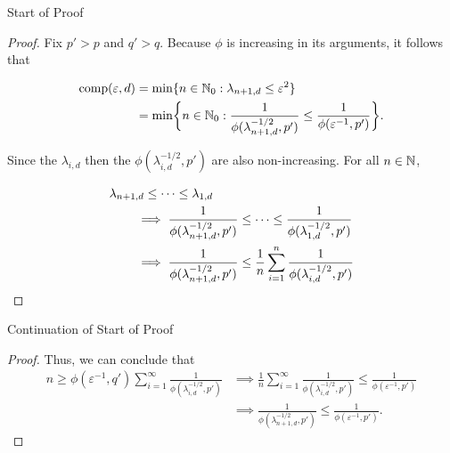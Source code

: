 \documentclass[11pt,compress,xcolor={usenames,dvipsnames},aspectratio=169]{beamer}
\begin{document}
\begin{frame}{Start of Proof}
\begin{proof}
\vspace{-3ex}
Fix $p' > p$ and $q' > q$.  Because $\phi$ is increasing in its arguments, it follows that

\vspace{-6ex}
\begin{align*}
    \operatorname{comp}(\varepsilon, d) &= \min \{n \in \mathbb{N}_{0} : \lambda_{n+1, d} \le \varepsilon^2\} \\
    &= \min \biggl\{n \in \mathbb{N}_{0} : \frac{1}{\phi(\lambda_{n+1, d}^{-1/2},p')} \le \frac{1}{\phi(\varepsilon^{-1},p')} \biggr\}.
\end{align*}

\vspace{-4ex}
Since the $\lambda_{i,d}$ then the $\phi(\lambda_{i, d}^{-1/2},p')$ are also non-increasing.  For all $n \in \mathbb{N}$,

\vspace{-6ex}
\begin{align*}
    \MoveEqLeft{\lambda_{n+1,d} \le \cdots \le \lambda_{1,d}} \\
    & \implies \frac{1}{\phi(\lambda_{n+1, d}^{-1/2},p')}  \le \cdots \le \frac{1}{\phi(\lambda_{1, d}^{-1/2},p')} \\
    & \implies \frac{1}{\phi(\lambda_{n+1, d}^{-1/2},p')} 
    \le \frac 1n \sum_{i=1}^n  \frac{1}{\phi(\lambda_{i, d}^{-1/2},p')}
\end{align*}
\end{proof}
\end{frame}

\begin{frame}{Continuation of Start of Proof}
\begin{proof}
\vspace{-3ex}
Thus, we can conclude that 
\begin{align*}
    n \ge \phi(\varepsilon^{-1},q') \sum_{i=1}^\infty \frac{1}{\phi(\lambda_{i, d}^{-1/2},p')}
    & \implies 
  \frac 1n \sum_{i=1}^\infty \frac{1}{\phi(\lambda_{i, d}^{-1/2},p')} \le  \frac{1}{\phi(\varepsilon^{-1},p')} \\
   & \implies   \frac{1}{\phi(\lambda_{n+1, d}^{-1/2},p')} \le \frac{1}{\phi(\varepsilon^{-1},p')}.
\end{align*}
\end{proof}
\end{frame}
\end{document}
